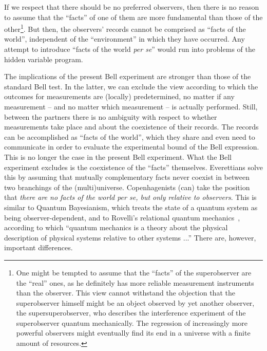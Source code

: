 \documentclass[12pt,a4]{article}
\begin{document}
If we respect that there should be no preferred observers, then there is no reason to assume that the ``facts'' of one of them are more fundamental than those of the other\footnote{One might be tempted to assume that the ``facts'' of the superobserver are the ``real'' ones, as he definitely has more reliable measurement instruments than the observer. This view cannot withstand the objection that the superobserver himself might be an object observed by yet another observer, the supersuperobserver, who describes the interference experiment of the superobserver quantum mechanically. The regression of increasingly more powerful observers might eventually find its end in a universe with a finite amount of resources.}. But then, the observers' records cannot be comprised as ``facts of the world'', independent of the ``environment'' in which they have occurred. Any attempt to introduce ``facts of the world {\it per se}'' would run into problems of the hidden variable program. 

The implications of the present Bell experiment are stronger than those of the standard Bell test. In the latter, we can exclude the view according to which the outcomes for measurements are (locally) predetermined, no matter if any measurement -- and no matter which measurement -- is actually performed. Still, between the partners there is no ambiguity with respect to whether measurements take place and about the coexistence of their records. The records can be accomplished as ``facts of the world'', which they share and even need to communicate in order to evaluate the experimental bound of the Bell expression. This is no longer the case in the present Bell experiment. What the Bell experiment excludes is the coexistence of the ``facts'' themselves. Everettians solve this by assuming that mutually complementary facts never coexist in between two branchings of the (multi)universe. Copenhagenists (can) take the position that {\it there are no facts of the world per se, but only relative to observers}. This is similar to Quantum Bayesianism, which treats the state of a quantum system as being observer-dependent, and to Rovelli's relational quantum mechanics~\cite{rovelli}, according to which ``quantum mechanics is a theory about the physical description of physical systems relative to other systems ...'' There are, however, important differences.  
\end{document}
